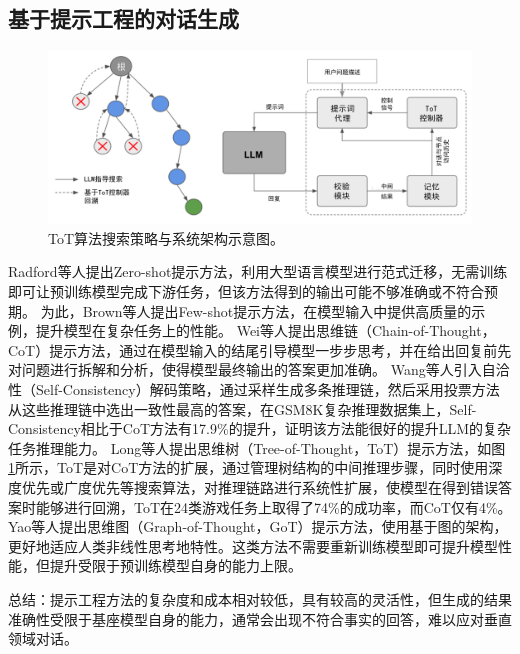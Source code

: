 \subsection{基于提示工程的对话生成}

\begin{figure}[htbp]
	\centering
	\includegraphics[scale=0.5]{Fig/tot.png}
	\caption{\label{tot}ToT算法搜索策略与系统架构示意图\cite{DBLP:journals/corr/abs-2305-08291}。}
\end{figure}

Radford等人\cite{radford2019language}提出Zero-shot提示方法，利用大型语言模型进行范式迁移，无需训练即可让预训练模型完成下游任务，但该方法得到的输出可能不够准确或不符合预期。
为此，Brown等人\cite{DBLP:conf/nips/BrownMRSKDNSSAA20}提出Few-shot提示方法，在模型输入中提供高质量的示例，提升模型在复杂任务上的性能。
Wei等人\cite{DBLP:conf/nips/Wei0SBIXCLZ22}提出思维链（Chain-of-Thought，CoT）提示方法，通过在模型输入的结尾引导模型一步步思考，并在给出回复前先对问题进行拆解和分析，使得模型最终输出的答案更加准确。
Wang等人\cite{DBLP:conf/iclr/0002WSLCNCZ23}引入自洽性（Self-Consistency）解码策略，通过采样生成多条推理链，然后采用投票方法从这些推理链中选出一致性最高的答案，在GSM8K复杂推理数据集上，Self-Consistency相比于CoT方法有17.9\%的提升，证明该方法能很好的提升LLM的复杂任务推理能力。
Long等人\cite{DBLP:journals/corr/abs-2305-08291}提出思维树（Tree-of-Thought，ToT）提示方法，如图\ref{tot}所示，ToT是对CoT方法的扩展，通过管理树结构的中间推理步骤，同时使用深度优先或广度优先等搜索算法，对推理链路进行系统性扩展，使模型在得到错误答案时能够进行回溯，ToT在24类游戏任务上取得了74\%的成功率，而CoT仅有4\%。
Yao等人\cite{DBLP:journals/corr/abs-2305-16582}提出思维图（Graph-of-Thought，GoT）提示方法，使用基于图的架构，更好地适应人类非线性思考地特性。这类方法不需要重新训练模型即可提升模型性能，但提升受限于预训练模型自身的能力上限。

总结：提示工程方法的复杂度和成本相对较低，具有较高的灵活性，但生成的结果准确性受限于基座模型自身的能力，通常会出现不符合事实的回答，难以应对垂直领域对话。

